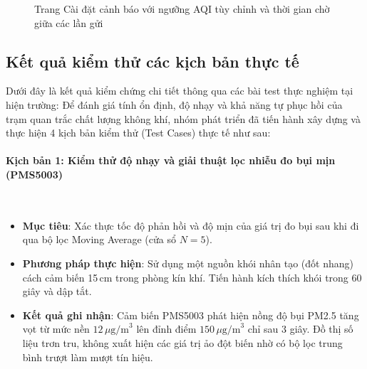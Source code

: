 \documentclass[12pt,a4paper]{article}
\begin{document}
\begin{figure}[H]
    \centering
    \caption{Trang Cài đặt cảnh báo với ngưỡng AQI tùy chỉnh và thời gian chờ giữa các lần gửi}
    \label{fig:settings_page}
\end{figure}



\subsection{Kết quả kiểm thử các kịch bản thực tế}
Dưới đây là kết quả kiểm chứng chi tiết thông qua các bài test thực nghiệm tại hiện trường:
Để đánh giá tính ổn định, độ nhạy và khả năng tự phục hồi của trạm quan trắc chất lượng không khí, nhóm phát triển đã tiến hành xây dựng và thực hiện 4 kịch bản kiểm thử (Test Cases) thực tế như sau:

\paragraph{Kịch bản 1: Kiểm thử độ nhạy và giải thuật lọc nhiễu đo bụi mịn (PMS5003)}\mbox{}\\
\begin{itemize}
    \item \textbf{Mục tiêu}: Xác thực tốc độ phản hồi và độ mịn của giá trị đo bụi sau khi đi qua bộ lọc Moving Average (cửa sổ $N=5$).
    \item \textbf{Phương pháp thực hiện}: Sử dụng một nguồn khói nhân tạo (đốt nhang) cách cảm biến 15\,cm trong phòng kín khí. Tiến hành kích thích khói trong 60 giây và dập tắt.
    \item \textbf{Kết quả ghi nhận}: Cảm biến PMS5003 phát hiện nồng độ bụi PM2.5 tăng vọt từ mức nền $12\,\mu\text{g/m}^3$ lên đỉnh điểm $150\,\mu\text{g/m}^3$ chỉ sau 3 giây. Đồ thị số liệu trơn tru, không xuất hiện các giá trị ảo đột biến nhờ có bộ lọc trung bình trượt làm mượt tín hiệu.
\end{itemize}
\end{document}
